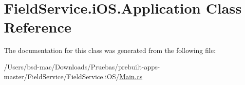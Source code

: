 \hypertarget{class_field_service_1_1i_o_s_1_1_application}{\section{Field\+Service.\+i\+O\+S.\+Application Class Reference}
\label{class_field_service_1_1i_o_s_1_1_application}
}


The documentation for this class was generated from the following file\+:\begin{DoxyCompactItemize}
\item 
/\+Users/bsd-\/mac/\+Downloads/\+Pruebas/prebuilt-\/apps-\/master/\+Field\+Service/\+Field\+Service.\+i\+O\+S/\hyperlink{_field_service_8i_o_s_2_main_8cs}{Main.\+cs}\end{DoxyCompactItemize}
